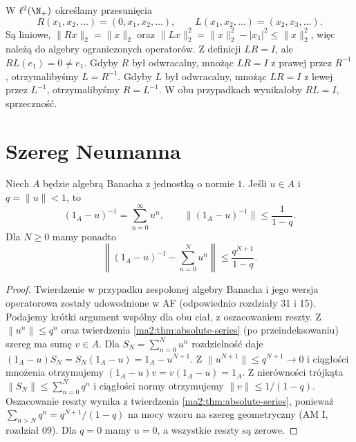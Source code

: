 \begin{przyklad}
\label{ma2:ex:one-sided-inverse}
W $\ell^2(\N_+)$ określamy przesunięcia
\[
 R(x_1,x_2,\ldots)=(0,x_1,x_2,\ldots),\qquad
 L(x_1,x_2,\ldots)=(x_2,x_3,\ldots).
\]
Są liniowe, $\|Rx\|_2=\|x\|_2$ oraz
$\|Lx\|_2^2=\|x\|_2^2-|x_1|^2\le\|x\|_2^2$,
więc należą do algebry ograniczonych operatorów.
Z definicji $LR=I$, ale $RL(e_1)=0\ne e_1$.
Gdyby $R$ był odwracalny, mnożąc $LR=I$ z prawej
przez $R^{-1}$, otrzymalibyśmy $L=R^{-1}$.
Gdyby $L$ był odwracalny, mnożąc $LR=I$ z lewej
przez $L^{-1}$, otrzymalibyśmy $R=L^{-1}$.
W obu przypadkach wynikałoby $RL=I$, sprzeczność.
\end{przyklad}

\section{Szereg Neumanna}

\begin{twierdzenie}
\label{ma2:thm:neumann}
\label{lem:neumann31}
\label{lem:neumann15}
Niech $A$ będzie algebrą Banacha z jednostką
o normie $1$. Jeśli $u\in A$ i $q=\|u\|<1$, to
\[
 (1_A-u)^{-1}=\sum_{n=0}^\infty u^n,\qquad
 \|(1_A-u)^{-1}\|\le\frac1{1-q}.
\]
Dla $N\ge0$ mamy ponadto
\[
 \left\|(1_A-u)^{-1}-\sum_{n=0}^N u^n\right\|
 \le\frac{q^{N+1}}{1-q}.
\]
\end{twierdzenie}
\begin{proof}
Twierdzenie w przypadku zespolonej algebry Banacha
i jego wersja operatorowa zostały udowodnione
w AF (odpowiednio rozdziały 31 i 15).
Podajemy krótki argument wspólny dla obu ciał,
z oszacowaniem reszty. Z $\|u^n\|\le q^n$ oraz
twierdzenia \ref{ma2:thm:absolute-series}
(po przeindeksowaniu) szereg ma sumę $v\in A$.
Dla $S_N=\sum_{n=0}^N u^n$ rozdzielność daje
$(1_A-u)S_N=S_N(1_A-u)=1_A-u^{N+1}$.
Z $\|u^{N+1}\|\le q^{N+1}\to0$ i ciągłości
mnożenia otrzymujemy $(1_A-u)v=v(1_A-u)=1_A$.
Z nierówności trójkąta $\|S_N\|\le\sum_{n=0}^N q^n$
i ciągłości normy otrzymujemy $\|v\|\le1/(1-q)$.
Oszacowanie reszty wynika z twierdzenia
\ref{ma2:thm:absolute-series}, ponieważ
$\sum_{n>N}q^n=q^{N+1}/(1-q)$ na mocy wzoru
na szereg geometryczny (AM I, rozdział 09).
Dla $q=0$ mamy $u=0$, a wszystkie reszty są zerowe.
\end{proof}

